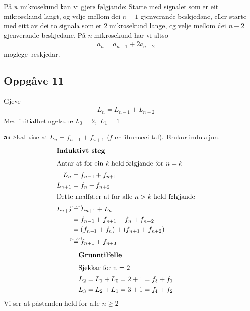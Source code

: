 \documentclass[a4paper, 11pt]{article}
\newcommand{\ceq}[1]{\stackrel{\mathclap{\tiny\mbox{#1}}}{=}}
\newcommand{\deloppg}[1]{\vspace{1mm}\noindent \textbf{\tt \themecolor{#1:}}}
\newcommand{\themeshade}{Mahogany}
\newcommand{\themecolor}[1]{\textcolor{\themeshade}{#1}}
\begin{document}
På \(n\) mikrosekund kan vi gjere følgjande: Starte med signalet som er eit mikrosekund langt, og velje
mellom dei \(n - 1\) gjenverande beskjedane, eller starte med eitt av dei to signala som er 2 mikrosekund
lange, og velje mellom dei \(n - 2\) gjenverande beskjedane. På \(n\) mikrosekund har vi altso
\begin{align*}
    a_n = a_{n-1} + 2a_{n-2}
\end{align*}
moglege beskjedar.

\subsection*{Oppgåve 11}
Gjeve
\begin{align*}
    L_n = L_{n-1} + L_{n+2}
\end{align*}
Med initialbetingelsane \(L_0 = 2,\; L_1 = 1\)

\deloppg{a} Skal vise at \(L_n = f_{n-1} + f_{n+1}\) (\(f\) er fibonacci-tal). Brukar induksjon.
\begin{align*}
    \intertext{\bf Induktivt steg}
    \intertext{Antar at for ein \(k\) held følgjande for \(n = k\)}
    L_n &= f_{n-1} + f_{n+1} \\
    L_{n+1} &= f_n + f_{n+2} \\
    \intertext{Dette medfører at for alle \(n > k\) held følgjande}
    L_{n+2} &\ceq{p. def} L_{n+1} + L_n \\
    &= f_{n-1} + f_{n+1} + f_n + f_{n+2} \\
    &= (f_{n-1} + f_n) + (f_{n+1} + f_{n+2}) \\
    &\ceq{p. def} f_{n+1} + f_{n + 3}
\end{align*}
\begin{align*}
    \intertext{\bf Grunntilfelle}
    \intertext{Sjekkar for n = 2}
    L_2 = L_1 + L_0 = 2 + 1 = f_3 + f_1 \\
    L_3 = L_2 + L_1 = 3 + 1 = f_4 + f_2
\end{align*}
Vi ser at påstanden held for alle \(n \geq 2\)
\end{document}
